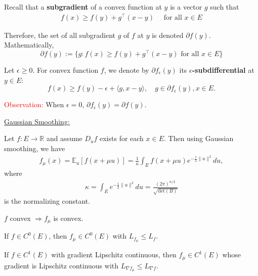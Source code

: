 \documentclass{article}
\begin{document}
\begin{definition} Recall that a \textbf{subgradient} of a convex function at $y$ is a vector $g$ such that
\begin{align}
    f(x) \geq f(y) + g^\top (x-y) \quad \text{ for all } x \in E
\end{align} 

Therefore, the set of all subgradient $g$ of $f$ at $y$ is denoted $\partial f(y)$. Mathematically,
$$ \partial f(y):= \{ g : f(x) \geq f(y) + g^\top (x-y) \text{ for all } x \in E \} $$
\end{definition}

\begin{definition} Let $\epsilon \geq 0$. For convex function $f$, we denote by $\partial f_{\epsilon}(y)$ its \textbf{$\epsilon$-subdifferential} at $y \in E$:
$$ f(x) \geq f(y) - \epsilon + \langle g, x - y\rangle, \quad g \in \partial f_{\epsilon}(y), x \in E. $$ 

\textcolor{red}{Observation:} When $\epsilon = 0$, $\partial f_{\epsilon}(y) = \partial f(y)$. \newline \end{definition}

\underline{Gaussian Smoothing:} \newline 

Let $f: E \to \mathbb{R}$ and assume $D_uf$ exists for each $x \in E$. Then using Gaussian smoothing, we have 
\begin{align}
    f_{\mu}(x) = \mathbb{E}_u[f(x+\mu u)] = \frac{1}{\kappa}\int_E f(x+\mu u)e^{-\frac{1}{2}\|u\|^2}du,
\end{align}
where 
\begin{align}
    \kappa = \int_E e^{-\frac{1}{2}\|u\|^2}du = \frac{(2\pi)^{n/2}}{\sqrt{\text{det}(B)}}
\end{align}
is the normalizing constant. 

\begin{lemma} $f$ convex $\Rightarrow f_{\mu}$ is convex. \end{lemma} 

\begin{lemma} If  $f \in C^0(E)$, then $f_{\mu} \in C^0(E)$ with $L_{f_{\mu}} \leq L_f$.  \end{lemma}

\begin{lemma} If $f \in C^1(E)$ with gradient Lipschitz continuous, then $f_{\mu} \in C^1(E)$ whose gradient is Lipschitz continuous with $L_{\nabla f_{\mu}} \leq L_{\nabla f}$. \end{lemma}
\end{document}
